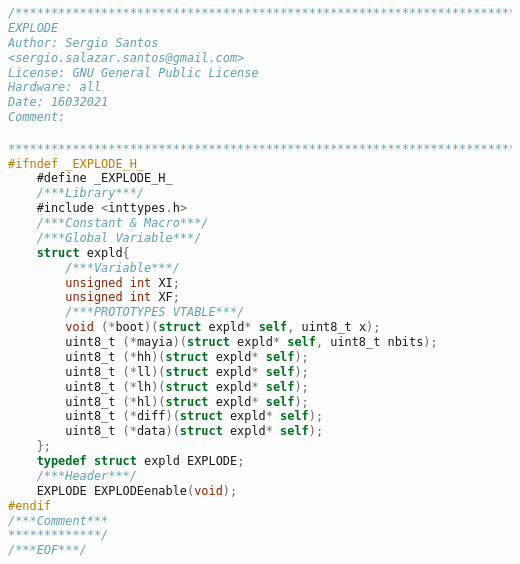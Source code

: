 \begin{lstlisting}[language=C, caption={explode.h}, label=explode-h, captionpos=b]
/************************************************************************
EXPLODE
Author: Sergio Santos
<sergio.salazar.santos@gmail.com>
License: GNU General Public License
Hardware: all
Date: 16032021
Comment:

************************************************************************/
#ifndef _EXPLODE_H_
	#define _EXPLODE_H_
	/***Library***/
	#include <inttypes.h>
	/***Constant & Macro***/
	/***Global Variable***/
	struct expld{
		/***Variable***/
		unsigned int XI;
		unsigned int XF;
		/***PROTOTYPES VTABLE***/
		void (*boot)(struct expld* self, uint8_t x);
		uint8_t (*mayia)(struct expld* self, uint8_t nbits);
		uint8_t (*hh)(struct expld* self);
		uint8_t (*ll)(struct expld* self);
		uint8_t (*lh)(struct expld* self);
		uint8_t (*hl)(struct expld* self);
		uint8_t (*diff)(struct expld* self);
		uint8_t (*data)(struct expld* self);
	};
	typedef struct expld EXPLODE;
	/***Header***/
	EXPLODE EXPLODEenable(void);
#endif
/***Comment***
*************/
/***EOF***/
\end{lstlisting}
